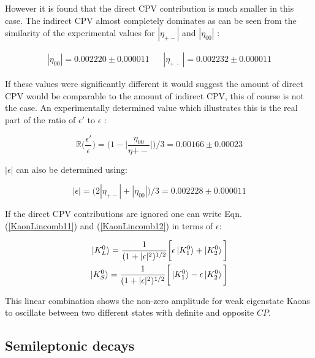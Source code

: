 \noindent However it is found that the direct CPV contribution is much smaller in this case. The indirect CPV almost completely dominates as can be seen from the similarity of the experimental values for $|\eta_{+-}|$ and $|\eta_{00}|$ \cite{PDGKaons}:

\begin{align*}
|\eta_{00}| = 0.002220 \pm 0.000011 &  & |\eta_{+-}| = 0.002232 \pm 0.000011 
\end{align*}  

\noindent If these values were significantly different it would suggest the amount of direct CPV would be comparable to the amount of indirect CPV, this of course is not the case. An experimentally determined value which illustrates this is the real part of the ratio of $\epsilon'$ to $\epsilon$ \cite{PDGKaons}:

\begin{equation*}
\mathbb{R} \bigg(\frac{\epsilon'}{\epsilon} \bigg)  = \bigg(1 - \bigg|\frac{\eta_{00}}{\eta{+-}}\bigg|\bigg) / 3 = 0.00166 \pm 0.00023
\end{equation*}

\smallskip

\noindent $|\epsilon|$ can also be determined using:

\begin{equation*} 
|\epsilon| = \big(2 |\eta_{+-}| + |\eta_{00}|\big)/3 = 0.002228 \pm 0.000011
\end{equation*} 

\smallskip

\noindent If the direct CPV contributions are ignored one can write Eqn.(\ref{KaonLincomb11}) and (\ref{KaonLincomb12}) in terms of $\epsilon$:

\begin{align}
\label{KaonLincomb21}
\ket{K^{0}_{L}} = \frac{1}{(1+|\epsilon|^2)^{1/2}} \bigg[ \epsilon \ket{K^{0}_{1}} + \ket{K^{0}_{2}}\bigg] \\
\label{KaonLincomb22}
\ket{K^{0}_{S}} = \frac{1}{(1+|\epsilon|^2)^{1/2}} \bigg[ \ket{K^{0}_{1}} - \epsilon \ket{K^{0}_{2}}\bigg]
\end{align}

\smallskip

\noindent This linear combination shows the non-zero amplitude for weak eigenstate Kaons to oscillate between two different states with definite and opposite $CP$.

\subsection{Semileptonic decays}\label{Kevin:Kaon_semileptonic}

